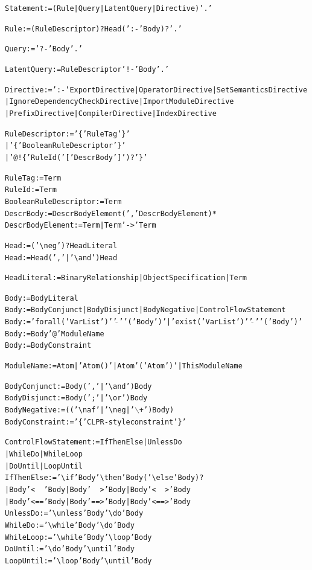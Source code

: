 \documentclass[11pt]{article}
\newcommand{\ERGO}{\mbox{\ensuremath{\cal{E}}\smaller{{\sc{RGO}}}}\xspace}
\newcommand{\bs}{\textbackslash}
\newcommand{\RULELOGNAF}{{\texttt{{\bs}naf}}\xspace}
\newcommand{\RULELOGNEG}{{\texttt{{\bs}neg}}\xspace}
\begin{document}
{\small
\begin{alltt}

Statement := (Rule | Query | LatentQuery | Directive) '.'

Rule := (RuleDescriptor)? Head (':-' Body)? '.'

Query := '?-' Body '.'

LatentQuery := RuleDescriptor '!-' Body '.'

Directive := ':-' ExportDirective | OperatorDirective | SetSemanticsDirective
	             | IgnoreDependencyCheckDirective | ImportModuleDirective
                     | PrefixDirective | CompilerDirective | IndexDirective

RuleDescriptor := '\@\{' RuleTag '\}'
                  | '\@\@\{' BooleanRuleDescriptor '\}'
                  | '@!\{' RuleId ( '[' DescrBody ']' )? '\}'

RuleTag := Term
RuleId := Term
BooleanRuleDescriptor := Term
DescrBody := DescrBodyElement (',' DescrBodyElement)*
DescrBodyElement := Term | Term '->' Term

Head := ('\RULELOGNEG')? HeadLiteral
Head := Head (',' | '\bs{}and') Head

HeadLiteral := BinaryRelationship | ObjectSpecification | Term

Body := BodyLiteral
Body := BodyConjunct | BodyDisjunct | BodyNegative | ControlFlowStatement
Body := 'forall(' VarList ')' '\ensuremath{\widehat{\ }}' '(' Body ')' | 'exist(' VarList ')' '\ensuremath{\widehat{\ }}' '(' Body ')'
Body := Body '@' ModuleName
Body := BodyConstraint

ModuleName := Atom | 'Atom()' | Atom '(' Atom ')' | ThisModuleName

BodyConjunct := Body (',' | '\bs{}and') Body
BodyDisjunct := Body (';' | '\bs{}or') Body
BodyNegative := (('\RULELOGNAF' | '\RULELOGNEG | '\ensuremath{\backslash}+') Body)
BodyConstraint := '\{' CLPR-style constraint '\}'

ControlFlowStatement  := IfThenElse | UnlessDo
                          | WhileDo | WhileLoop
                          | DoUntil | LoopUntil
IfThenElse := '\bs{}if' Body '\bs{}then' Body  ('\bs{}else' Body)?
                | Body '<~~' Body | Body '~~>' Body | Body '<~~>' Body
                | Body '<==' Body | Body '==>' Body | Body '<==>' Body
UnlessDo   := '\bs{}unless' Body '\bs{}do' Body
WhileDo    := '\bs{}while' Body '\bs{}do' Body
WhileLoop  := '\bs{}while' Body '\bs{}loop' Body
DoUntil    := '\bs{}do' Body '\bs{}until' Body
LoopUntil  := '\bs{}loop' Body '\bs{}until' Body


\end{alltt}}
\end{document}
